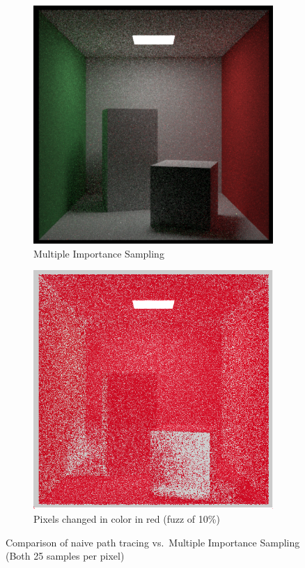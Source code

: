 \documentclass[12pt]{article}
\begin{document}
\begin{figure}[H]
\begin{subfigure}[t]{0.32\textwidth}
        \includegraphics[width=\textwidth]{images/25_samp/combPDF.png}
        \caption{Multiple Importance Sampling}
        \label{fig:mis_sampling}
    \end{subfigure}
    \hfill
    \begin{subfigure}[t]{0.32\textwidth}
        \centering
        \includegraphics[width=\textwidth]{images/25_samp/comparison.png}
        \caption{Pixels changed in color in red (fuzz of 10\%)}
        \label{fig:comparison}
    \end{subfigure}
    \caption{Comparison of naive path tracing vs.\ Multiple Importance Sampling (Both 25 samples per pixel)}
    \label{fig:sampling_comparison}
\end{figure}
\end{document}
